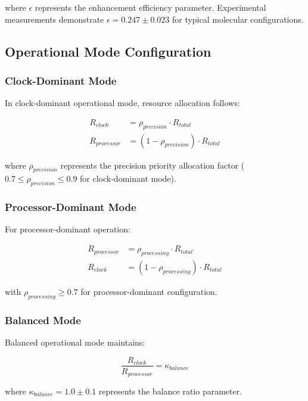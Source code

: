where $\epsilon$ represents the enhancement efficiency parameter. Experimental measurements demonstrate $\epsilon = 0.247 \pm 0.023$ for typical molecular configurations.

\subsection{Operational Mode Configuration}

\subsubsection{Clock-Dominant Mode}

In clock-dominant operational mode, resource allocation follows:

\begin{align}
R_{clock} &= \rho_{precision} \cdot R_{total} \\
R_{processor} &= (1 - \rho_{precision}) \cdot R_{total}
\end{align}

where $\rho_{precision}$ represents the precision priority allocation factor ($0.7 \leq \rho_{precision} \leq 0.9$ for clock-dominant mode).

\subsubsection{Processor-Dominant Mode}

For processor-dominant operation:

\begin{align}
R_{processor} &= \rho_{processing} \cdot R_{total} \\
R_{clock} &= (1 - \rho_{processing}) \cdot R_{total}
\end{align}

with $\rho_{processing} \geq 0.7$ for processor-dominant configuration.

\subsubsection{Balanced Mode}

Balanced operational mode maintains:

\begin{equation}
\frac{R_{clock}}{R_{processor}} = \kappa_{balance}
\end{equation}

where $\kappa_{balance} = 1.0 \pm 0.1$ represents the balance ratio parameter.


